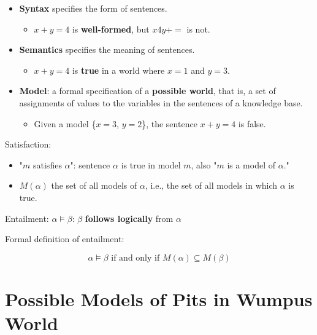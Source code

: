 \documentclass[11pt]{article}
\begin{document}
\begin{itemize}
\item \textbf{Syntax} specifies the form of sentences.

\begin{itemize}
\item \(x + y = 4\) is \textbf{well-formed}, but \(x4y+=\) is not.
\end{itemize}

\item \textbf{Semantics} specifies the meaning of sentences.

\begin{itemize}
\item \(x + y = 4\) is \textbf{true} in a world where \(x = 1\) and \(y = 3\).
\end{itemize}

\item \textbf{Model}: a formal specification of a \textbf{possible world}, that is, a set of assignments of values to the variables in the sentences of a knowledge base.

\begin{itemize}
\item Given a model \{\(x = 3\), \(y = 2\)\}, the sentence \(x + y = 4\) is false.
\end{itemize}
\end{itemize}

Satisfaction:

\begin{itemize}
\item "\(m\) satisfies \(\alpha\)": sentence \(\alpha\) is true in model \(m\), also "\(m\) is a model of \(\alpha\)."
\item \(M(\alpha)\) the set of all models of \(\alpha\), i.e., the set of all models in which \(\alpha\) is true.
\end{itemize}

Entailment: \(\alpha \models \beta\): \(\beta\) \textbf{follows logically} from \(\alpha\)

Formal definition of entailment:

\begin{equation*}
\alpha \models \beta \text{ if and only if } M(\alpha) \subseteq M(\beta)
\end{equation*}
\section{Possible Models of Pits in Wumpus World}
\label{sec:orgbd95c65}
\end{document}
